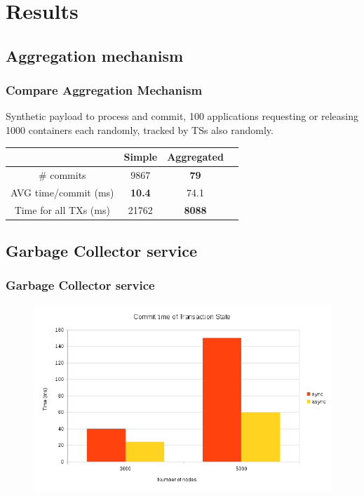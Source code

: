 \documentclass{beamer}
\begin{document}
\section{Results}
\subsection{Aggregation mechanism}
\begin{frame}
\frametitle{Compare Aggregation Mechanism}
Synthetic payload to process and commit, 100 applications requesting or releasing
1000 containers each randomly, tracked by TSs also randomly. \\[2em]

\centering
\begin{tabular}{| c | c | c | c |}
\hline
  & Simple & Aggregated \\
\hline
\# commits & 9867 & \textbf{79} \\
\hline
AVG time/commit (ms) & \textbf{10.4} & 74.1 \\
\hline
Time for all TXs (ms) & 21762 & \textbf{8088} \\
\hline
\end{tabular}
\end{frame}

\subsection{Garbage Collector service}
\begin{frame}
\frametitle{Garbage Collector service}
\begin{figure}
\centering
  \includegraphics[scale=0.5]{resources/async_commit_time.png}
\end{figure}
\end{frame}
\end{document}
